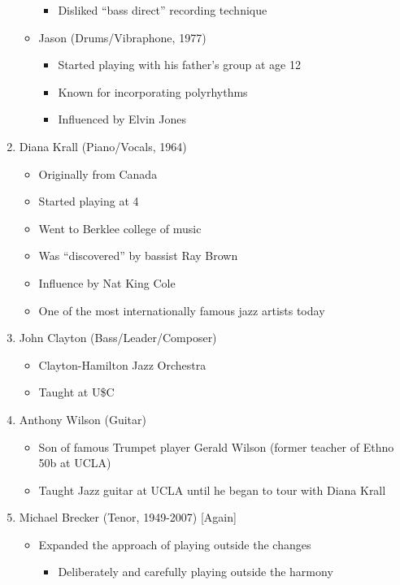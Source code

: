\documentclass[]{article}
\providecommand{\tightlist}{%
  \setlength{\itemsep}{0pt}\setlength{\parskip}{0pt}}
\begin{document}
\begin{enumerate}
\begin{itemize}
    \begin{itemize}
    \tightlist
    \item
      Disliked ``bass direct'' recording technique
    \end{itemize}
  \item
    Jason (Drums/Vibraphone, 1977)

    \begin{itemize}
    \tightlist
    \item
      Started playing with his father's group at age 12
    \item
      Known for incorporating polyrhythms
    \item
      Influenced by Elvin Jones
    \end{itemize}
  \end{itemize}
\item
  Diana Krall (Piano/Vocals, 1964)

  \begin{itemize}
  \tightlist
  \item
    Originally from Canada
  \item
    Started playing at 4
  \item
    Went to Berklee college of music
  \item
    Was ``discovered'' by bassist Ray Brown
  \item
    Influence by Nat King Cole
  \item
    One of the most internationally famous jazz artists today
  \end{itemize}
\item
  John Clayton (Bass/Leader/Composer)

  \begin{itemize}
  \tightlist
  \item
    Clayton-Hamilton Jazz Orchestra
  \item
    Taught at U\$C
  \end{itemize}
\item
  Anthony Wilson (Guitar)

  \begin{itemize}
  \tightlist
  \item
    Son of famous Trumpet player Gerald Wilson (former teacher of Ethno
    50b at UCLA)
  \item
    Taught Jazz guitar at UCLA until he began to tour with Diana Krall
  \end{itemize}
\item
  Michael Brecker (Tenor, 1949-2007) {[}Again{]}

  \begin{itemize}
  \tightlist
  \item
    Expanded the approach of playing outside the changes

    \begin{itemize}
    \tightlist
    \item
      Deliberately and carefully playing outside the harmony
    \end{itemize}
  \end{itemize}
\end{enumerate}
\end{document}

